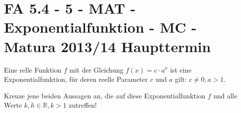 \section{FA 5.4 - 5 - MAT - Exponentialfunktion - MC - Matura 2013/14 Haupttermin}

\begin{beispiel}{1} %
			Eine relle Funktion $f$ mit der Gleichung $f(x)=c\cdot a^x$ ist eine Exponentialfunktion, für deren reelle Parameter $c$ und $a$ gilt: $c\neq 0,a>1$.
			
			Kreuze jene beiden Aussagen an, die auf diese Exponentialfunktion $f$ und alle Werte $k,h\in\mathbb{R},k>1$ zutreffen!\leer
			
\end{beispiel}